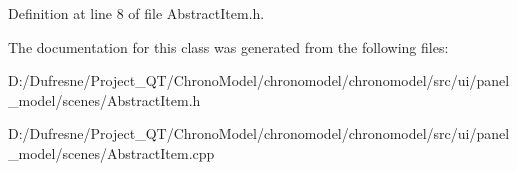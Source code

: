 Definition at line 8 of file Abstract\-Item.\-h.



The documentation for this class was generated from the following files\-:\begin{DoxyCompactItemize}
\item 
D\-:/\-Dufresne/\-Project\-\_\-\-Q\-T/\-Chrono\-Model/chronomodel/chronomodel/src/ui/panel\-\_\-model/scenes/Abstract\-Item.\-h\item 
D\-:/\-Dufresne/\-Project\-\_\-\-Q\-T/\-Chrono\-Model/chronomodel/chronomodel/src/ui/panel\-\_\-model/scenes/Abstract\-Item.\-cpp\end{DoxyCompactItemize}
